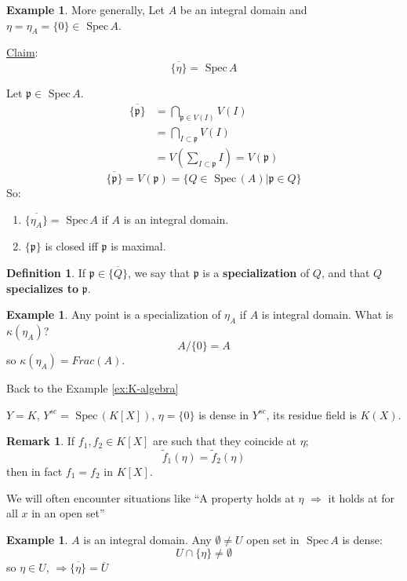\documentclass[11pt]{article}
\theoremstyle{definition}
\newtheorem{dfn}[thm]{Definition}
\newtheorem{rmk}[thm]{Remark}
\newtheorem{ex}[thm]{Example}
\newcommand{\spec}{\text{ Spec}\,}
\newcommand{\scp}{{\mathfrak p}}
\newcommand{\Lrta}{\Longrightarrow}
\begin{document}
\begin{ex}
More generally, Let $A$ be an integral domain and $\eta=\eta_A=\{0\}\in\spec A$.

\underline{Claim}: 
$$
\overline{\{\eta\}}=\spec A
$$

Let $\scp\in\spec A$.
$$
\begin{aligned}
\overline{\{\scp\}}&=\bigcap_{\scp\in V(I)}V(I)\\
&=\bigcap_{I\subset \scp}V(I)\\
&=V(\sum_{I\subset\scp} I )=V(\scp)
\end{aligned}
$$
$$
\overline{\{\scp\}}=V(\scp)=\{Q\in\spec(A)|\scp\in Q\}
$$
So:
\begin{enumerate}
\item $\overline{\{\eta_A\}}=\spec A$ if $A$ is an integral domain.
\item $\{\scp\}$ is closed iff $\scp$ is maximal.
\end{enumerate}
\end{ex}

\begin{dfn}
If $\scp\in\overline{\{Q\}}$, we say that $\scp$ is a \textbf{specialization} of $Q$, and that $Q$ \textbf{specializes to} $\scp$.
\end{dfn}

\begin{ex}
Any point is a specialization of $\eta_A$ if $A$ is integral domain. What is $\kappa(\eta_A)$?
$$
A/\{0\}=A
$$
so $\kappa(\eta_A)=Frac(A)$.
\end{ex}

Back to the Example \ref{ex:K-algebra}

$Y=K$, $Y^{sc}=\spec (K[X])$, $\eta=\{0\}$ is dense in $Y^{sc}$, its residue field is $K(X)$.

\begin{rmk}
If $f_1,f_2\in K[X]$ are such that they coincide at $\eta$;
$$
\tilde{f}_1(\eta)=\tilde{f}_2(\eta)
$$
then in fact $  f_1=f_2$ in $K[X]$.
\end{rmk}

We will often encounter situations like ``A property holds at $\eta$ $\Lrta$ it holds at for all $x$ in an open set''

\begin{ex}
$A$ is an integral domain. Any $\emptyset \neq U$ open set in $\spec A$ is dense:
$$
U\cap \{\eta\}\neq \emptyset
$$
so $\eta\in U$, $\Lrta \overline{\{\eta\}}=\overline{U}$
\end{ex}
\end{document}
